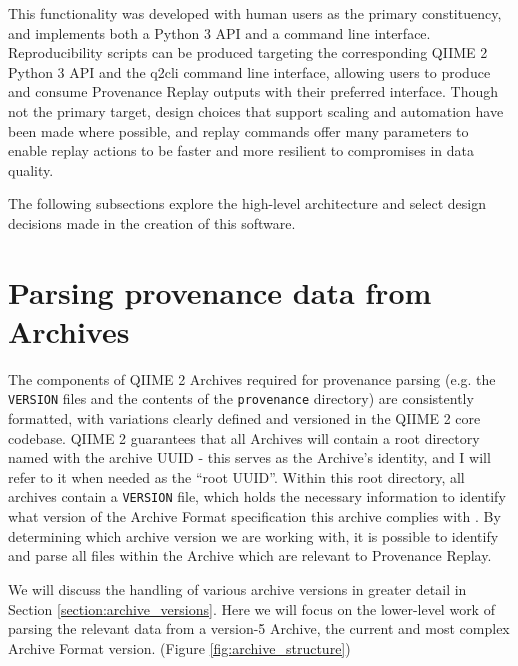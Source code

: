 This functionality was developed with human users as the primary constituency,
and implements both a Python 3 API and a command line interface. Reproducibility
scripts can be produced targeting the corresponding QIIME 2 Python 3 API and the
q2cli command line interface, allowing users to produce and consume Provenance
Replay outputs with their preferred interface. Though not the primary target,
design choices that support scaling and automation have been made where
possible, and replay commands offer many parameters to enable replay actions to
be faster and more resilient to compromises in data quality.

The following subsections explore the high-level architecture and select design
decisions made in the creation of this software.

\section{Parsing provenance data from Archives}

The components of QIIME 2 Archives required for provenance parsing (e.g. the
\texttt{VERSION} files and the contents of the \texttt{provenance} directory) are consistently
formatted, with variations clearly defined and versioned in the QIIME 2 core
codebase. QIIME 2 guarantees that all Archives will contain a root directory
named with the archive UUID - this serves as the Archive’s identity, and I will
refer to it when needed as the “root UUID”. Within this root directory, all
archives contain a \texttt{VERSION} file, which holds the necessary information to
identify what version of the Archive Format specification this archive complies
with \parencite{qiime_2_development_team_anatomy_2018}. By determining which
archive version we are working with, it is possible to identify and parse all
files within the Archive which are relevant to Provenance Replay.

We will discuss the handling of various archive versions in greater detail
in Section \ref{section:archive_versions}. Here we will focus on the lower-level work of parsing the relevant data
from a version-5 Archive, the current and most complex Archive Format version.
(Figure \ref{fig:archive_structure})


